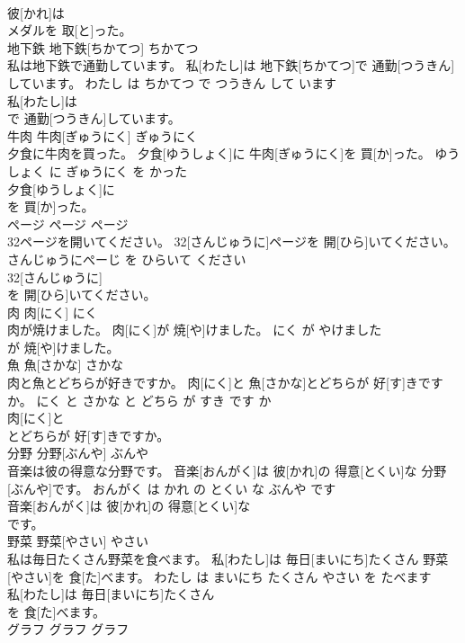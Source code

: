 \documentclass[8pt]{extreport}
\begin{document}
\begin{CJK}{UTF8}{min}
\\	彼[かれ]は
\\	メダルを 取[と]った。		
\\	地下鉄	地下鉄[ちかてつ]	ちかてつ	
\\	私は地下鉄で通勤しています。	私[わたし]は 地下鉄[ちかてつ]で 通勤[つうきん]しています。	わたし は ちかてつ で つうきん して います	
\\	私[わたし]は
\\	で 通勤[つうきん]しています。		
\\	牛肉	牛肉[ぎゅうにく]	ぎゅうにく	
\\	夕食に牛肉を買った。	夕食[ゆうしょく]に 牛肉[ぎゅうにく]を 買[か]った。	ゆうしょく に ぎゅうにく を かった	
\\	夕食[ゆうしょく]に
\\	を 買[か]った。		
\\	ページ	ページ	ページ	
\\	32ページを開いてください。	32[さんじゅうに]ページを 開[ひら]いてください。	さんじゅうにぺーじ を ひらいて ください	
\\	32[さんじゅうに]
\\	を 開[ひら]いてください。		
\\	肉	肉[にく]	にく	
\\	肉が焼けました。	肉[にく]が 焼[や]けました。	にく が やけました	
\\	が 焼[や]けました。		
\\	魚	魚[さかな]	さかな	
\\	肉と魚とどちらが好きですか。	肉[にく]と 魚[さかな]とどちらが 好[す]きですか。	にく と さかな と どちら が すき です か	
\\	肉[にく]と
\\	とどちらが 好[す]きですか。		
\\	分野	分野[ぶんや]	ぶんや	
\\	音楽は彼の得意な分野です。	音楽[おんがく]は 彼[かれ]の 得意[とくい]な 分野[ぶんや]です。	おんがく は かれ の とくい な ぶんや です	
\\	音楽[おんがく]は 彼[かれ]の 得意[とくい]な
\\	です。		
\\	野菜	野菜[やさい]	やさい	
\\	私は毎日たくさん野菜を食べます。	私[わたし]は 毎日[まいにち]たくさん 野菜[やさい]を 食[た]べます。	わたし は まいにち たくさん やさい を たべます	
\\	私[わたし]は 毎日[まいにち]たくさん
\\	を 食[た]べます。		
\\	グラフ	グラフ	グラフ	

\end{CJK}
\end{document}
